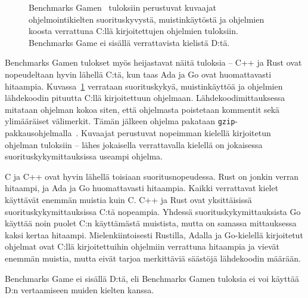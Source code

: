 \begin{figure}[ht!]
    \begin{adjustbox}{center}
    \begin{minipage}{1.15\textwidth}
    \begin{minipage}{0.5\textwidth}
        
        \vspace*{-0.8cm}
    \end{minipage}
    \begin{minipage}{0.5\textwidth}
        
        \vspace*{-0.9cm}
    \end{minipage}
    \end{minipage}
    \end{adjustbox}
    \begin{adjustbox}{center}
    \begin{minipage}{1.15\textwidth}
    \end{minipage}
    \end{adjustbox}
    \caption{
        Benchmarks Gamen~\citep[tiedot haettu 10.1.2019]{benchmarks} tuloksiin
        perustuvat kuvaajat ohjelmointikielten suorituskyvystä, muistinkäytöstä
        ja ohjelmien koosta verrattuna C:llä kirjoitettujen ohjelmien
        tuloksiin. Benchmarks Game ei sisällä verrattavista kielistä D:tä.}
    \label{fig:benchmarksgame}
\end{figure}

Benchmarks Gamen tulokset myös heijastavat näitä tuloksia -- C++ ja Rust ovat
nopeudeltaan hyvin lähellä C:tä, kun taas Ada ja Go ovat huomattavasti
hitaampia. Kuvassa~\ref{fig:benchmarksgame} verrataan suorituskykyä,
muistinkäyttöä ja ohjelmien lähdekoodin pituutta C:llä kirjoitettuun ohjelmaan.
Lähdekoodimittauksessa mitataan ohjelman kokoa siten, että ohjelmasta
poistetaan kommentit sekä ylimääräiset välimerkit. Tämän jälkeen ohjelma
pakataan \texttt{gzip}-pakkausohjelmalla~\citep{howmeasured}. Kuvaajat
perustuvat nopeimman kielellä kirjoitetun ohjelman tuloksiin -- lähes
jokaisella verrattavalla kielellä on jokaisessa suorituskykymittauksissa
useampi ohjelma.

C ja C++ ovat hyvin lähellä toisiaan suoritusnopeudessa. Rust on jonkin verran
hitaampi, ja Ada ja Go huomattavasti hitaampia. Kaikki verrattavat kielet
käyttävät enemmän muistia kuin C. C++ ja Rust ovat yksittäisissä
suorituskykymittauksissa C:tä nopeampia. Yhdessä suorituskykymittauksista Go
käyttää noin puolet C:n käyttämästä muistista, mutta on samassa mittauksessa
kaksi kertaa hitaampi. Mielenkiintoisesti Rustilla, Adalla ja Go-kielellä
kirjoitetut ohjelmat ovat C:llä kirjoitettuihin ohjelmiin verrattuna hitaampia
ja vievät enemmän muistia, mutta eivät tarjoa merkittäviä säästöjä lähdekoodin
määrään.

Benchmarks Game ei sisällä D:tä, eli Benchmarks Gamen tuloksia ei voi käyttää
D:n vertaamiseen muiden kielten kanssa.

\FloatBarrier

\null

\newpage
